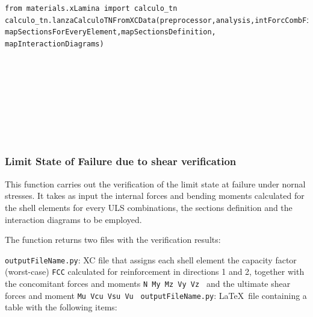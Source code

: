  
\begin{verbatim}
from materials.xLamina import calculo_tn
calculo_tn.lanzaCalculoTNFromXCData(preprocessor,analysis,intForcCombFileName,outputFileName, 
mapSectionsForEveryElement,mapSectionsDefinition, mapInteractionDiagrams)
\end{verbatim}
\begin{paramFuncTable}
\preprocessor{} \\
\analysis{} \\
\\
\outputFileName{}\\
\mapSectionsForEveryElement{} \\
\mapSectionsDefinition{} \\
\mapInteractionDiagrams{} \\
\end{paramFuncTable}


\subsubsection{Limit State of Failure due to shear verification}
This function carries out the verification of the limit state at failure under nornal stresses. It takes as input the internal forces and bending moments calculated for the shell elements for every ULS combinations, the sections definition and the interaction diagrams to be employed.

The function returns two files with the verification results:

{\tt outputFileName.py}: XC file that assigns each shell element the capacity factor (worst-case) {\tt FCC} calculated for reinforcement in directions 1 and 2, together with the concomitant forces and moments {\tt N My Mz  Vy Vz } and the ultimate shear forces and moment {\tt Mu Vcu Vsu Vu }
{\tt outputFileName.py}: \LaTeX\  file containing a table with the following items:

